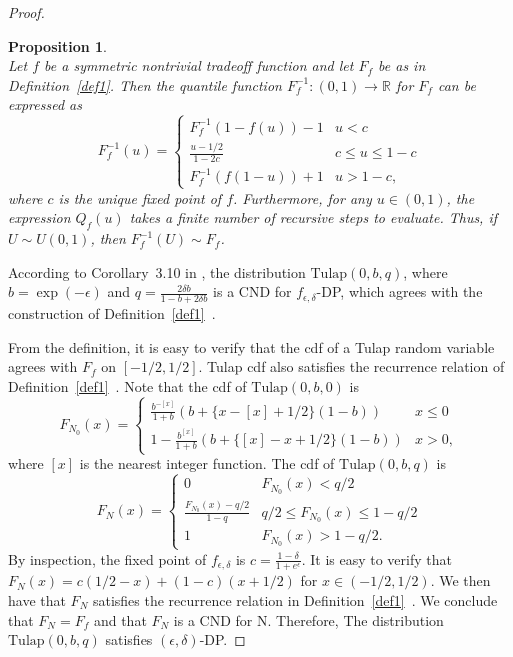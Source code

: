 \documentclass{article}
\newtheorem{prop}{Proposition}
\begin{document}
\begin{proof}
\begin{prop}\label{prop1}   %
    \cite[Proposition~F.6]{awan2023canonical} \\
    Let $f$ be a symmetric nontrivial tradeoff function and let $F_f$ be as in Definition~\ref{def1}. 
    Then the quantile function $F_f^{-1}:(0,1)\rightarrow \mathbb{R}$ for $F_f$ can be expressed as
    \[F_f^{-1}(u) = \begin{cases}
    F_f^{-1}(1-f(u))-1&u<c\\
    \frac{u-1/2}{1-2c}&c\leq u\leq 1-c\\
    F_f^{-1}(f(1-u))+1&u>1-c,
    \end{cases}\]
    where $c$ is the unique fixed point of $f$. 
    {Furthermore, for any $u\in (0,1)$, the expression $Q_f(u)$ takes a finite number of recursive steps to evaluate. Thus,} 
    if $U\sim U(0,1)$, then $F_f^{-1}(U) \sim F_f$. 
\end{prop}

According to Corollary~3.10 in \cite{awan2023canonical}, 
the distribution $\mathrm{Tulap}(0,b,q)$, where $b=\exp(-\epsilon)$ and $q = \frac{2\delta b}{1-b+2\delta b}$ 
is a CND for $f_{\epsilon,\delta}$-DP, which agrees with the construction of Definition~\ref{def1}~\parencite{awan2023canonical}. 

From the definition, it is easy to verify that the cdf of a Tulap random variable agrees with $F_f$ on $[-1/2,1/2]$. 
Tulap cdf also satisfies the recurrence relation of Definition~\ref{def1}~\parencite{awan2023canonical}. 
Note that the cdf of $\mathrm{Tulap}(0,b,0)$ is 
\[F_{N_0}(x) = \begin{cases}
    \frac{b^{-[x]}}{1+b}(b+\{x-[x]+1/2\}(1-b))& x\leq 0\\
    1- \frac{b^{[x]}}{1+b}(b+\{[x]-x+1/2\}(1-b))&x>0,
\end{cases}\]
where $[x]$ is the nearest integer function. 
The cdf of $\mathrm{Tulap}(0,b,q)$ is
\[F_N(x) = \begin{cases}
    0&F_{N_0}(x)<q/2\\
    \frac{F_{N_0}(x)-q/2}{1-q}& q/2\leq F_{N_0}(x)\leq 1-q/2\\
    1&F_{N_0}(x)>1-q/2.
\end{cases}\]
By inspection, the fixed point of $f_{\epsilon,\delta}$ is $c=\frac{1-\delta}{1+e^\epsilon}$. 
It is easy to verify that $F_N(x) = c(1/2-x) + (1-c)(x+1/2)$ for $x\in (-1/2,1/2)$. 
We then have that $F_N$ satisfies the recurrence relation in Definition~\ref{def1}~\parencite{awan2023canonical}. 
We conclude that $F_N = F_f$ and that $F_N$ is a CND for N. Therefore, The distribution $\mathrm{Tulap}(0,b,q)$ satisfies $(\epsilon, \delta)$-DP.
\end{proof}

\printbibliography
\end{document}
